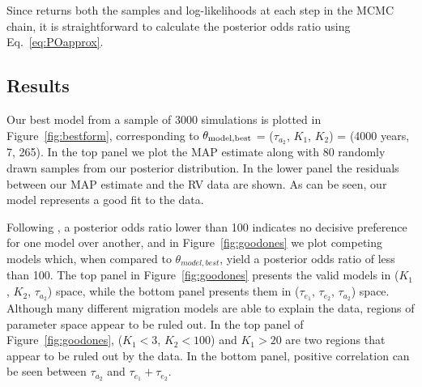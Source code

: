 Since \emcee returns both the samples and log-likelihoods at each step in the MCMC chain, it is straightforward to calculate the posterior odds ratio using Eq.~\ref{eq:POapprox}. 


\subsection{Results}
\label{sec:formresults}

Our best model from a sample of 3000 simulations is plotted in Figure~\ref{fig:bestform}, corresponding to $\theta_{\rm model, best}$ = ($\tau_{a_2}$, $K_1$, $K_2$) = (4000 years, 7, 265).
In the top panel we plot the MAP estimate along with 80 randomly drawn samples from our posterior distribution.
In the lower panel the residuals between our MAP estimate and the RV data are shown. 
As can be seen, our model represents a good fit to the data. 

Following \citet{Kass1995}, a posterior odds ratio lower than 100 indicates no decisive preference for one model over another, and in Figure~\ref{fig:goodones} we plot competing models which, when compared to $\theta_{model,best}$, yield a posterior odds ratio of less than 100. 
The top panel in Figure~\ref{fig:goodones} presents the valid models in ($K_1$, $K_2$, $\tau_{a_2}$) space, while the bottom panel presents them in ($\tau_{e_1}$, $\tau_{e_2}$, $\tau_{a_2}$) space. 
Although many different migration models are able to explain the data, regions of parameter space appear to be ruled out.
In the top panel of Figure~\ref{fig:goodones}, ($K_1 < 3$, $K_2 < 100$) and $K_1 > 20$ are two regions that appear to be ruled out by the data. 
In the bottom panel, positive correlation can be seen between $\tau_{a_2}$ and $\tau_{e_1} + \tau_{e_2}$.

